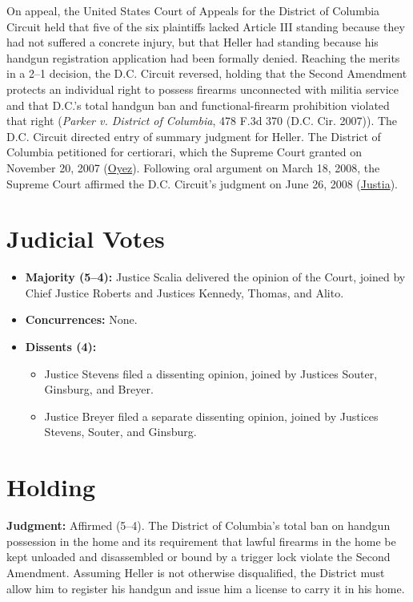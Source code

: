 \documentclass[12pt]{article}
\begin{document}
On appeal, the United States Court of Appeals for the District of Columbia Circuit held that five of the six plaintiffs lacked Article III standing because they had not suffered a concrete injury, but that Heller had standing because his handgun registration application had been formally denied. Reaching the merits in a 2--1 decision, the D.C. Circuit reversed, holding that the Second Amendment protects an individual right to possess firearms unconnected with militia service and that D.C.'s total handgun ban and functional-firearm prohibition violated that right (\textit{Parker v. District of Columbia}, 478 F.3d 370 (D.C. Cir. 2007)). The D.C. Circuit directed entry of summary judgment for Heller. The District of Columbia petitioned for certiorari, which the Supreme Court granted on November 20, 2007 (\href{https://www.oyez.org/cases/2007/07-290}{Oyez}). Following oral argument on March 18, 2008, the Supreme Court affirmed the D.C. Circuit's judgment on June 26, 2008 (\href{https://supreme.justia.com/cases/federal/us/554/570/}{Justia}).

\section{Judicial Votes}
\begin{itemize}
  \item \textbf{Majority (5--4):} Justice Scalia delivered the opinion of the Court, joined by Chief Justice Roberts and Justices Kennedy, Thomas, and Alito.
  \item \textbf{Concurrences:} None.
  \item \textbf{Dissents (4):}
    \begin{itemize}
      \item Justice Stevens filed a dissenting opinion, joined by Justices Souter, Ginsburg, and Breyer.
      \item Justice Breyer filed a separate dissenting opinion, joined by Justices Stevens, Souter, and Ginsburg.
    \end{itemize}
\end{itemize}

\section{Holding}
\textbf{Judgment:} Affirmed (5--4). The District of Columbia's total ban on handgun possession in the home and its requirement that lawful firearms in the home be kept unloaded and disassembled or bound by a trigger lock violate the Second Amendment. Assuming Heller is not otherwise disqualified, the District must allow him to register his handgun and issue him a license to carry it in his home.
\end{document}

